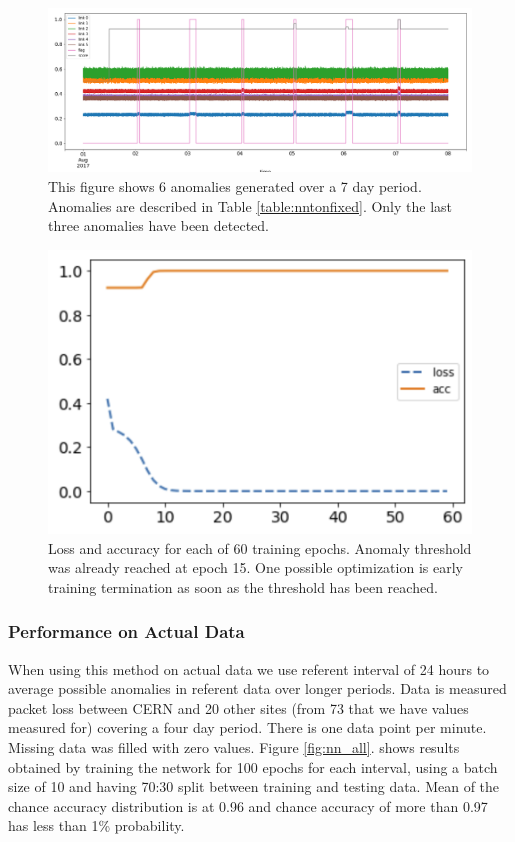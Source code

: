 \documentclass[5p]{elsarticle}
\begin{document}
\begin{figure}[htbp]
    \centering
    \includegraphics[width=\linewidth]{nn_with_auc.png}
    \caption{This figure shows 6 anomalies generated over a 7 day period. Anomalies are described in Table \ref{table:nntonfixed}. Only the last three anomalies have been detected.}
    \label{fig:nnonfixed}
\end{figure}

\begin{figure}[htbp]
    \centering
    \includegraphics[width=0.8\linewidth]{nn_epochs.png}
    \caption{Loss and accuracy for each of 60 training epochs. Anomaly threshold was already reached at epoch 15. One possible optimization is early training termination as soon as the threshold has been reached. }
    \label{fig:loss}
\end{figure}


\subsubsection{Performance on Actual Data}

When using this method on actual data we use referent interval of 24 hours to average possible anomalies in referent data over longer periods. Data is measured packet loss between CERN and 20 other sites (from 73 that we have values measured for) covering a four day period. There is one data point per minute. Missing data was filled with zero values. Figure \ref{fig:nn_all}. shows results obtained by training the network for 100 epochs for each interval, using a batch size of 10 and having 70:30 split between training and testing data. Mean of the chance accuracy distribution is at 0.96 and chance accuracy of more than 0.97 has less than 1\% probability. 
\end{document}
